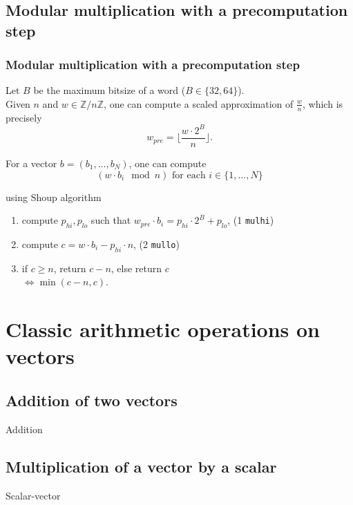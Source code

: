 \documentclass[10pt]{beamer}
\begin{document}
\subsection{Modular multiplication with a precomputation step}
\begin{frame}
    \frametitle{Modular multiplication with a precomputation step}

    \begin{example}
    Let $B$ be the maximum bitsize of a word ($B\in \{32, 64\}$). \\
    Given $n$ and $w \in \mathbb{Z}/n\mathbb{Z}$, one can compute a scaled approximation 
    of $\frac{w}{n}$, which is precisely $$ w_{pre} = \biggl\lfloor\dfrac{w\cdot 2^{B}}{n} \biggr\rfloor.$$
    \end{example}

    \bigskip
    For a vector $b = (b_1,\dots, b_N)$, one can compute 
    $$(w\cdot b_i \mod n) \text{ for each } i\in \{1, \dots, N\}$$

    using Shoup algorithm%

    \begin{enumerate}
        \item compute $p_{hi}, p_{lo}$ such that $w_{pre} \cdot b_i = p_{hi}\cdot 2^B + p_{lo}$, \hfill (1 \texttt{mulhi})
        \item compute $c = w\cdot b_i - p_{hi}\cdot n$, \hfill (2 \texttt{mullo})
        \item if $c \geq n$, return $c-n$, else return $c$ \\
            $\Longleftrightarrow \min(c-n, c)$.
    \end{enumerate}
\end{frame}

\section{Classic arithmetic operations on vectors}
\subsection{Addition of two vectors}
\begin{frame}
    Addition
\end{frame}

\subsection{Multiplication of a vector by a scalar}
\begin{frame}
    Scalar-vector
\end{frame}
\end{document}
